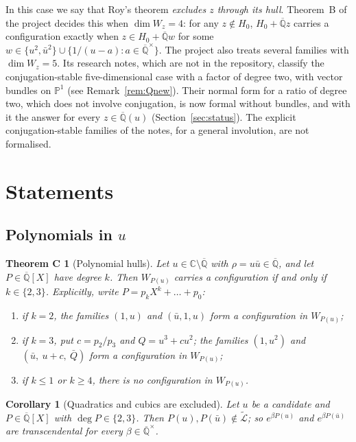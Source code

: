 \documentclass[11pt,a4paper]{article}
\theoremstyle{plain}
\newtheorem{corollary}[theorem]{Corollary}
\newtheorem*{theoremC}{Theorem C}
\theoremstyle{definition}
\newcommand{\C}{\mathbb{C}}
\newcommand{\Qbar}{\overline{\mathbb{Q}}}
\newcommand{\Lt}{\widetilde{\mathcal{L}}}
\begin{document}
In this case we say that Roy's theorem \emph{excludes $z$ through its hull}. Theorem~B
of the project \cite[Thm.~10.6]{BP} decides this when $\dim W_{z}=4$: for any
$z\notin H_{0}$, $H_{0}+\Qbar z$ carries a configuration exactly when $z\in H_{0}+\Qbar w$
for some $w\in\{u^{2},\bar u^{2}\}\cup\{1/(u-a):a\in\Qbar^{\times}\}$. The project also
treats several families with $\dim W_{z}=5$. Its research notes, which are not in the repository, classify the
conjugation-stable five-dimensional case with a factor of degree two, with vector bundles on $\mathbb{P}^{1}$ (see
Remark~\ref{rem:Qnew}). Their normal form for a ratio of degree two, which does not involve conjugation, is now
formal without bundles, and with it the answer for every $z\in\Qbar(u)$ (Section~\ref{sec:status}). The explicit
conjugation-stable families of the notes, for a general involution, are not formalised.

\section{Statements}\label{sec:statements}

\subsection*{Polynomials in $u$}

\begin{theoremC}[Polynomial hulls]
Let $u\in\C\setminus\Qbar$ with $\rho=u\bar u\in\Qbar$, and let $P\in\Qbar[X]$ have degree
$k$. Then $W_{P(u)}$ carries a configuration if and only if $k\in\{2,3\}$. Explicitly,
write $P=p_{k}X^{k}+\dots+p_{0}$:
\begin{enumerate}[label=\textup{(\roman*)}]
\item if $k=2$, the families $(1,u)$ and $(\bar u,1,u)$ form a configuration in
$W_{P(u)}$;
\item if $k=3$, put $c=p_{2}/p_{3}$ and $Q=u^{3}+cu^{2}$; the families $(1,u^{2})$ and
$(\bar u,\ u+c,\ \bar Q)$ form a configuration in $W_{P(u)}$;
\item if $k\le1$ or $k\ge4$, there is no configuration in $W_{P(u)}$.
\end{enumerate}
\end{theoremC}

\begin{corollary}[Quadratics and cubics are excluded]\label{cor:cubic}
Let $u$ be a candidate and $P\in\Qbar[X]$ with $\deg P\in\{2,3\}$. Then
$P(u),P(\bar u)\notin\Lt$; so $e^{\beta P(u)}$ and $e^{\beta P(\bar u)}$ are transcendental
for every $\beta\in\Qbar^{\times}$.
\end{corollary}
\end{document}
